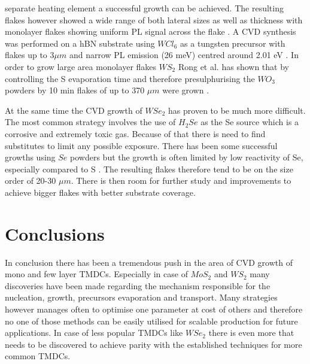 separate heating element a successful growth can be achieved. The resulting flakes however showed a wide range of both lateral sizes as well as thickness with monolayer flakes showing uniform PL signal across the flake \cite{Cong2013}.  A CVD synthesis was performed on a hBN substrate using $WCl_6$ as a tungsten precursor with flakes up to $3 \mu m$ and narrow PL emission (26 meV) centred around 2.01 eV \cite{doi:10.1021/nn503093k}. In order to grow large area monolayer flakes $WS_2$ Rong et al. has shown that by controlling the S evaporation time and therefore presulphurising the $WO_3$ powders by 10 min flakes of up to 370 $\mu m$ were grown \cite{Rong2014}.

At the same time the CVD growth of $WSe_2$ has proven to be much more difficult. The most common strategy involves the use of $H_2Se$ as the Se source which is a corrosive and extremely toxic gas. Because of that there is need to find substitutes to limit any possible exposure. There has been some successful growths using $Se$ powders but the growth is often limited by low reactivity of Se, especially compared to S \cite{Ahn2017}\cite{Hsu2017}\cite{Li2015}. The resulting flakes therefore tend to be on the size order of 20-30 $\mu m$. There is then room for further study and improvements to achieve bigger flakes with better substrate coverage.

\section{Conclusions}

In conclusion there has been a tremendous push in the area of CVD growth of mono and few layer TMDCs. Especially in case of $MoS_2$ and $WS_2$ many discoveries have been made regarding the mechanism responsible for the nucleation, growth, precursors evaporation and transport. Many strategies however manages often to optimise one parameter at cost of others and therefore no one of those methods can be easily utilised for scalable production for future applications. In case of less popular TMDCs like $WSe_2$ there is even more that needs to be discovered to achieve parity with the established techniques for more common TMDCs.